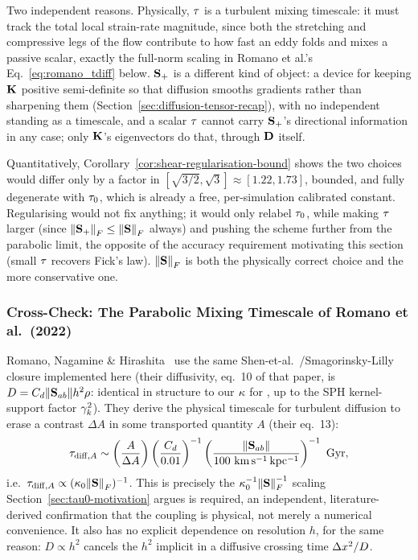 \begin{remark}
\label{rem:no-shear-regularisation-in-tau}
Two independent reasons. Physically, $\tau$ is a turbulent mixing
timescale: it must track the total local strain-rate magnitude, since both
the stretching and compressive legs of the flow contribute to how fast an
eddy folds and mixes a passive scalar, exactly the full-norm scaling in
Romano et al.'s Eq.~\eqref{eq:romano_tdiff} below. $\mathbf{S}_{+}$ is a different
kind of object: a device for keeping $\mathbf{K}$ positive semi-definite so
that diffusion smooths gradients rather than sharpening them
(Section~\ref{sec:diffusion-tensor-recap}), with no independent standing
as a timescale, and a scalar $\tau$ cannot carry $\mathbf{S}_{+}$'s
directional information in any case; only $\mathbf{K}$'s eigenvectors do that,
through $\mathbf{D}$ itself.

Quantitatively, Corollary~\ref{cor:shear-regularisation-bound} shows the
two choices would differ only by a factor in
$[\sqrt{3/2},\sqrt3]\approx[1.22,1.73]$, bounded, and fully degenerate
with $\tau_0$, which is already a free, per-simulation calibrated
constant. Regularising would not fix anything; it would only relabel
$\tau_0$, while making $\tau$ larger (since
$\norm{\mathbf{S}_{+}}_F\leq\norm{\mathbf{S}}_F$ always) and pushing the scheme
further from the parabolic limit, the opposite of the accuracy
requirement motivating this section (small $\tau$ recovers Fick's
law). $\norm{\mathbf{S}}_F$ is both the physically correct choice and the more
conservative one.
\end{remark}

\subsubsection{Cross-Check: The Parabolic Mixing Timescale of Romano et al.~(2022)}
Romano, Nagamine \& Hirashita~\citeyear{Romano2022} use the same
Shen-et-al.~\citeyear{ShenWadsleyStinson2010}/Smagorinsky-Lilly~\citeyear{Smagorinsky1963}
closure implemented here (their diffusivity, eq.~10 of that paper, is
$D=C_d\norm{\mathbf{S}_{ab}}h^2\rho$: identical in structure to our
$\kappa$ for , up to the SPH kernel-support
factor $\gamma_{k}^2$). They derive the physical timescale for turbulent
diffusion to erase a contrast $\Delta A$ in some transported quantity $A$
(their eq.~13):
\begin{equation}
  \label{eq:romano_tdiff}
  \tau_{{\rm diff},A} \sim \left(\frac{A}{\Delta A}\right)
  \left(\frac{C_d}{0.01}\right)^{-1}
  \left(\frac{\norm{\mathbf{S}_{ab}}}{100\ {\rm km\,s^{-1}\,kpc^{-1}}}\right)^{-1}\ {\rm Gyr} ,
\end{equation}
i.e.\ $\tau_{{\rm diff},A}\propto(\kappa_{0}\norm{\mathbf{S}}_F)^{-1}$. This
is precisely the $\kappa_{0}^{-1}\norm{\mathbf{S}}_F^{-1}$ scaling
Section~\ref{sec:tau0-motivation} argues is required, an independent,
literature-derived confirmation that the coupling is physical, not merely
a numerical convenience. It also has no explicit dependence on resolution
$h$, for the same reason: $D\propto h^2$ cancels
the $h^2$ implicit in a diffusive crossing time $\Delta x^2/D$.

